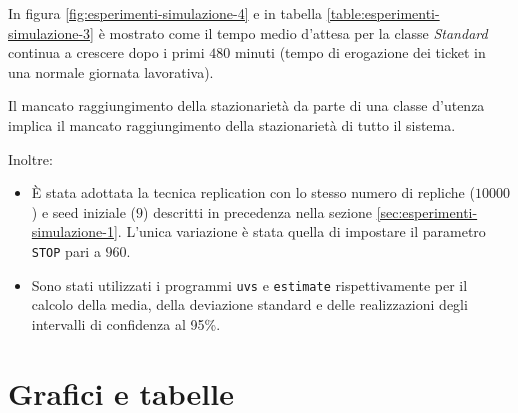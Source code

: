 In figura \ref{fig:esperimenti-simulazione-4} e in tabella \ref{table:esperimenti-simulazione-3} è mostrato come il tempo medio d'attesa per la classe \uo{} \textsl{Standard} continua a crescere dopo i primi $480$ minuti (tempo di erogazione dei ticket in una normale giornata lavorativa). 

Il mancato raggiungimento della stazionarietà da parte di una classe d'utenza implica il mancato raggiungimento della stazionarietà di tutto il sistema.

Inoltre:
\begin{itemize}
\item È stata adottata la tecnica replication con lo stesso numero di repliche ($10000$) e seed iniziale ($9$) descritti in precedenza nella sezione \ref{sec:esperimenti-simulazione-1}. L'unica variazione è stata quella di impostare il parametro \texttt{STOP} pari a $960$.
\item Sono stati utilizzati i programmi \texttt{uvs} e \texttt{estimate} rispettivamente per il calcolo della media, della deviazione standard e delle realizzazioni degli intervalli di confidenza al 95\%.
\end{itemize}

\newpage
\section{Grafici e tabelle}
